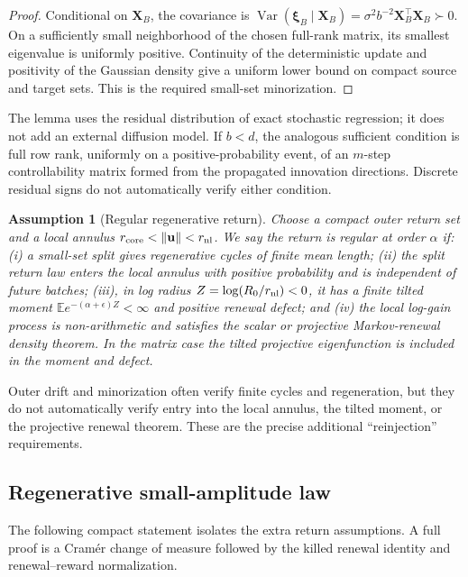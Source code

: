 \documentclass[10pt]{article}
\newtheorem{assumption}[theorem]{Assumption}
\theoremstyle{definition}
\theoremstyle{remark}
\newcommand{\E}{\mathbb E}
\newcommand{\norm}[1]{\left\lVert#1\right\rVert}
\newcommand{\uvec}{\mathbf u}
\newcommand{\xivec}{\boldsymbol\xi}
\begin{document}
\begin{proof}
Conditional on $\mathbf X_B$, the covariance is
$\operatorname{Var}(\xivec_B\mid\mathbf X_B)=
\sigma^2b^{-2}\mathbf X_B^\top\mathbf X_B\succ0$.  On a sufficiently small
neighborhood of the chosen full-rank matrix, its smallest eigenvalue is
uniformly positive.  Continuity of the deterministic update and positivity
of the Gaussian density give a uniform lower bound on compact source and
target sets.  This is the required small-set minorization.
\end{proof}

The lemma uses the residual distribution of exact stochastic regression; it
does not add an external diffusion model.  If $b<d$, the analogous sufficient
condition is full row rank, uniformly on a positive-probability event, of an
$m$-step controllability matrix formed from the propagated innovation
directions.  Discrete residual signs do not automatically verify either
condition.

\begin{assumption}[Regular regenerative return]
\label{ass:regular-return}
Choose a compact outer return set and a local annulus
$r_{\rm core}<\norm{\uvec}<r_{\rm nl}$.  We say the return is regular at
order $\alpha$ if: (i) a small-set split gives regenerative cycles of finite
mean length; (ii) the split return law enters the local annulus with positive
probability and is independent of future batches; (iii), in log radius
$Z=\log(R_0/r_{\rm nl})<0$, it has a finite tilted moment
$\E e^{-(\alpha+\epsilon)Z}<\infty$ and positive renewal defect; and
(iv) the local log-gain process is non-arithmetic and satisfies the scalar or
projective Markov-renewal density theorem.  In the matrix case the tilted
projective eigenfunction is included in the moment and defect.
\end{assumption}

Outer drift and minorization often verify finite cycles and regeneration, but
they do not automatically verify entry into the local annulus, the tilted
moment, or the projective renewal theorem.  These are the precise additional
``reinjection'' requirements.

\subsection{Regenerative small-amplitude law}

The following compact statement isolates the extra return assumptions.  A
full proof is a Cram\'er change of measure followed by the killed renewal
identity and renewal--reward normalization.
\end{document}
